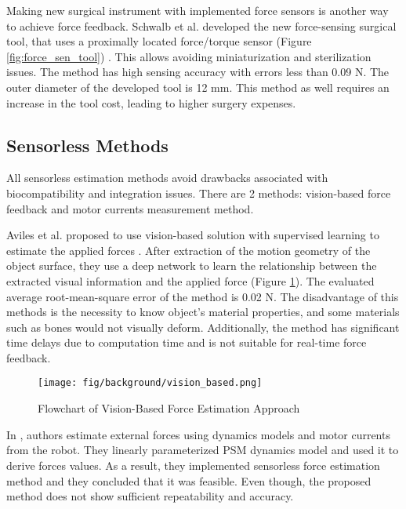 Making new surgical instrument with implemented force sensors is another way to achieve force feedback. Schwalb et al. developed the new force-sensing surgical tool, that uses a proximally located force/torque sensor (Figure \ref{fig:force_sen_tool}) \cite{schwalb_forcesensing_2017}. This allows avoiding miniaturization and sterilization issues. The method has high sensing accuracy with errors less than 0.09 N. The outer diameter of the developed tool is 12 mm. This method as well requires an increase in the tool cost, leading to higher surgery expenses.

\subsection{Sensorless Methods}

All sensorless estimation methods avoid drawbacks associated with biocompatibility and integration issues. There are 2 methods: vision-based force feedback and motor currents measurement method.

Aviles et al. proposed to use vision-based solution with supervised learning to estimate the applied forces \cite{aviles_towards_2017}. After extraction of the motion geometry of the object surface, they use a deep network to learn the relationship between the extracted visual information and the applied force (Figure \ref{fig:visual_appr}). The evaluated average root-mean-square error of the method is 0.02 N.  The disadvantage of this methods is the necessity to know object’s material properties, and some materials such as bones would not visually deform. Additionally, the method has significant time delays due to computation time and is not suitable for real-time force feedback. 

\begin{figure}[h]
	\begin{center}
	\texttt{[image: fig/background/vision\_based.png]}
	\end{center}
	\vspace{-4mm}
	\caption[Flowchart of Vision-Based Force Estimation Approach]
	{Flowchart of Vision-Based Force Estimation Approach \cite{aviles_towards_2017}}
	\label{fig:visual_appr}
	\vspace{-2mm}
\end{figure}

In \cite{sang_hongqiang_external_2017, yoon_design_2015}, authors estimate external forces using dynamics models and motor currents from the robot. They linearly parameterized PSM dynamics model and used it to derive forces values. As a result, they implemented sensorless force estimation method and they concluded that it was feasible. Even though, the proposed method does not show sufficient repeatability and accuracy.


